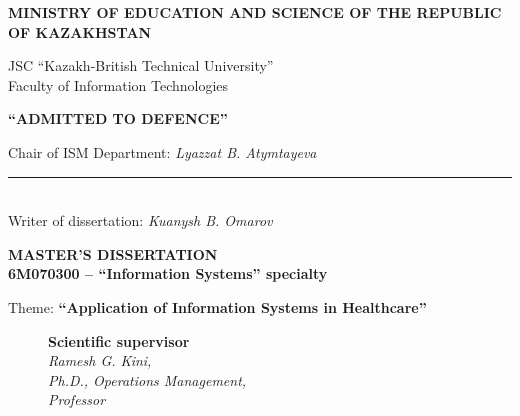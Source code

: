 \begin{titlepage}
    \pagestyle{empty}
    \begin{center}
        {\bf{\MakeUppercase{Ministry of education and science of the republic of Kazakhstan}}

        \vspace{14pt}

        JSC ``Kazakh-British Technical University''\\
        Faculty of Information Technologies}

       \vspace{14pt}

        \begin{flushright}
            {\bf \MakeUppercase{``Admitted to defence''}}

            Chair of ISM Department: {\em Lyazzat B. Atymtayeva}\\
            \vspace{0.5\baselineskip}
            \rule{13em}{0.4pt}\\
            \vspace{14pt}
          Writer of dissertation: {\em Kuanysh B. Omarov}
          \vspace{14pt}
        \end{flushright}

        {\bf
        \MakeUppercase{Master's Dissertation}\\
        6M070300 -- ``Information Systems'' specialty}

        \vspace{14pt}

        Theme: {\bf ``Application of Information Systems in Healthcare''}

        \vspace{28pt}

        \begin{figure}[ht]
            \begin{minipage}[t]{0.6\linewidth}
                {\bf Scientific supervisor}\\

                {\em Ramesh G. Kini,\\
                Ph.D., Operations Management, \\
                Professor}\\
            \end{minipage}
        \end{figure}


\end{center}
\end{titlepage}
